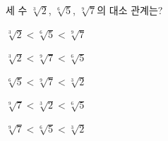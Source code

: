 세 수 $\sqrt[3]{2}$, $\sqrt[6]{5}$, $\sqrt[9]{7}$의 대소 관계는?
\begin{choicesii}{\rule[-3ex]{0pt}{8ex}$\sqrt[3]{2}<\sqrt[6]{5}<\sqrt[9]{7}$}{\rule[-3ex]{0pt}{8ex}$\sqrt[3]{2}<\sqrt[9]{7}<\sqrt[6]{5}$}{\rule[-3ex]{0pt}{8ex}$\sqrt[6]{5}<\sqrt[9]{7}<\sqrt[3]{2}$}{\rule[-3ex]{0pt}{8ex}$\sqrt[9]{7}<\sqrt[3]{2}<\sqrt[6]{5}$}{\rule[-3ex]{0pt}{8ex}$\sqrt[9]{7}<\sqrt[6]{5}<\sqrt[3]{2}$}\end{choicesii}

